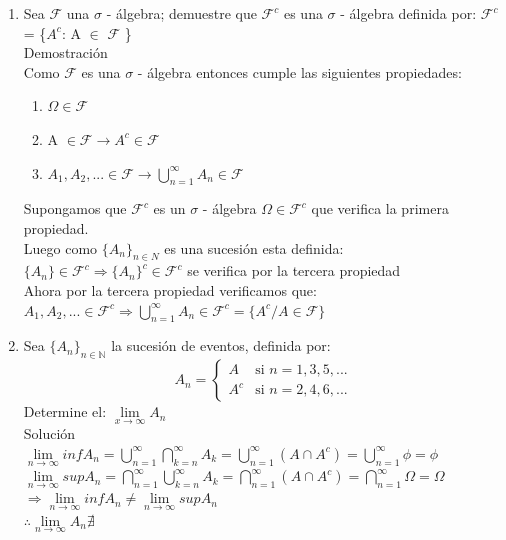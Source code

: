 \documentclass[12pt]{article}
\begin{document}
\begin{enumerate}
\item Sea $\mathcal{F}$ una $\sigma$ - álgebra; demuestre que $\mathcal{F}^c$ es una $\sigma$ - álgebra definida por: $\mathcal{F}^c$ = \{$A^c$: A $\in$ $\mathcal{F}$ \}\\[0.2cm]
Demostración\\[0.2cm]
Como $\mathcal{F}$ es una $\sigma$ - álgebra entonces cumple las siguientes propiedades:\\[0.2cm]
\begin{enumerate}[1.]
\item $\Omega \in \mathcal{F}  $
\item A $\in \mathcal{F}\longrightarrow A^{c} \in\mathcal{F}$
\item $A_1,A_2,... \in \mathcal{F} \longrightarrow\displaystyle\bigcup_{n=1}^{\infty}{A_n \in \mathcal{F}}$
\end{enumerate}
Supongamos que $\mathcal{F}^c$ es un $\sigma$ - álgebra $\Omega \in \mathcal{F}^c  $ que verifica la primera propiedad.\\[0.2cm]
Luego como $\{A_n\}_{n \in N}$ es una sucesión esta definida:\\[0.2cm]
$\{A_n\}\in \mathcal{F}^c \Rightarrow \{A_n\}^c \in  \mathcal{F}^c $ se verifica por la tercera propiedad\\[0.2cm]
Ahora por la tercera propiedad verificamos que:\\[0.2cm]
$A_1,A_2,... \in \mathcal{F}^c\Rightarrow \displaystyle\bigcup_{n=1}^{\infty}{A_n \in \mathcal{F}^c} = \{ A^c/ A \in \mathcal{F}\} $
 

\item Sea $\{A_n\}_{n\in\mathbb{N}}$ la sucesión de eventos, definida por:
\[A_n = \begin{cases} 
      A  & \mbox{si } n= 1,3,5,...        \\[0.5cm]
      A^c  & \mbox{si } n = 2,4,6,...
 \end{cases} \]
Determine el: $\lim\limits_{x \to \infty}A_n$\\[0.2cm]
Solución\\[0.2cm]
$\lim\limits_{n \to \infty}{inf}A_n =\displaystyle\bigcup_{n=1}^{\infty}\displaystyle\bigcap_{k=n}^{\infty}A_k = \displaystyle\bigcup_{n=1}^{\infty}\left(A \cap A^c\right)= \displaystyle\bigcup_{n=1}^{\infty}\phi = \phi $\\[0.2cm]
$\lim\limits_{n \to \infty}{sup}A_n= \displaystyle\bigcap_{n=1}^{\infty}\displaystyle\bigcup_{k=n}^{\infty}A_k = \displaystyle\bigcap_{n=1}^{\infty}\left(A \cap A^c\right)= \displaystyle\bigcap_{n=1}^{\infty}\Omega = \Omega $\\[0.2cm]
$\Rightarrow \lim\limits_{n \to \infty}{inf}A_n \not = \lim\limits_{n \to \infty}{sup}A_n $\\[0.2cm]
$\therefore \lim\limits_{n \to \infty}A_n \nexists$




\end{enumerate}
\end{document}
